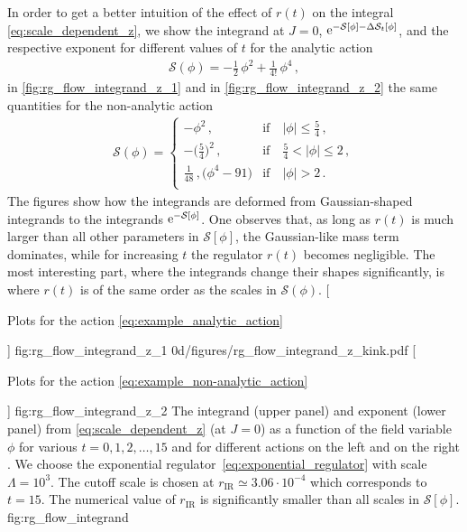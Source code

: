 In order to get a better intuition of the effect of $r(t)$ on the integral \eqref{eq:scale_dependent_z}, we show the integrand at $J=0$, $\mathrm{e}^{- \mathcal{S}[\phi] - \Delta \mathcal{S}_t [\phi]}$, and the respective exponent for different values of $t$ for the analytic action
\begin{align}
	\mathcal{S} ( \phi ) = - \tfrac{1}{2} \, \phi^2 + \tfrac{1}{4!} \, \phi^4 \, ,\label{eq:example_analytic_action}
\end{align}
in \cref{fig:rg_flow_integrand_z_1} and in \cref{fig:rg_flow_integrand_z_2} the same quantities for the non-analytic action
	\begin{align}
		\mathcal{S} ( \phi ) =
		\begin{cases}
			- \phi^2 \, ,								&	\text{if} \quad | \phi | \leq \tfrac{5}{4} \, ,	
			\\[.1em]
			- \big( \tfrac{5}{4} \big)^2 \, ,			&	\text{if} \quad \tfrac{5}{4} < | \phi | \leq 2 \, ,
			\\[.1em]
			\tfrac{1}{48} \,, \big( \phi^4 - 91 \big)	&	\text{if} \quad | \phi |>2 \, .
			\\
		\end{cases}	\label{eq:example_non-analytic_action}
	\end{align}
The figures show how the integrands are deformed from Gaussian-shaped integrands to the integrands $\mathrm{e}^{- \mathcal{S}[\phi]}$.
One observes that, as long as $r(t)$ is much larger than all other parameters in $\mathcal{S}[\phi]$, the Gaussian-like mass term dominates, while for increasing $t$ the regulator $r(t)$ becomes negligible.
The most interesting part, where the integrands change their shapes significantly, is where $r(t)$ is of the same order as the scales in $\mathcal{S} ( \phi )$.
	[\captionsetup{justification=centering}\caption{Plots for the action \eqref{eq:example_analytic_action}}]%
	{fig:rg_flow_integrand_z_1}%
	{0d/figures/rg_flow_integrand_z_kink.pdf}%
	[\captionsetup{justification=centering}\caption{Plots for the action  \eqref{eq:example_non-analytic_action}}]%
	{fig:rg_flow_integrand_z_2}%
	{%
	The integrand (upper panel) and exponent (lower panel) from \cref{eq:scale_dependent_z} (at $J = 0$) as a function of the field variable $\phi$ for various \rgtimes{} $t = 0, 1, 2, \ldots, 15$ and for different actions on the left  and on the right .
	We choose the exponential regulator~\eqref{eq:exponential_regulator} with \uv{} scale $\Lambda = 10^3$.
	The \ir{} cutoff scale is chosen at  $r_\mathrm{IR} \simeq 3.06 \cdot 10^{-4}$ which corresponds to $t = 15$.
	The numerical value of $r_\mathrm{IR}$ is significantly smaller than all scales in $\mathcal{S}[\phi]$.
	}%
	{fig:rg_flow_integrand}%


